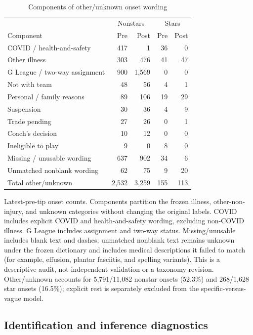 \documentclass[11pt]{article}
\begin{document}
\begin{table}[!htbp]\centering\caption{Components of other/unknown onset wording}\label{tab:otherwording}\small
\begin{tabular}{@{}lrrrr@{}}\toprule
 & \multicolumn{2}{c}{Nonstars} & \multicolumn{2}{c}{Stars}\\
Component & Pre & Post & Pre & Post\\\midrule
COVID / health-and-safety & 417 & 1 & 36 & 0\\
Other illness & 303 & 476 & 41 & 47\\
G League / two-way assignment & 900 & 1,569 & 0 & 0\\
Not with team & 48 & 56 & 4 & 1\\
Personal / family reasons & 89 & 106 & 19 & 29\\
Suspension & 30 & 36 & 4 & 9\\
Trade pending & 27 & 26 & 0 & 1\\
Coach's decision & 10 & 12 & 0 & 0\\
Ineligible to play & 9 & 0 & 8 & 0\\
Missing / unusable wording & 637 & 902 & 34 & 6\\
Unmatched nonblank wording & 62 & 75 & 9 & 20\\
\midrule Total other/unknown & 2,532 & 3,259 & 155 & 113\\\bottomrule\end{tabular}\par\smallskip\raggedright\footnotesize Latest-pre-tip onset counts. Components partition the frozen illness, other-non-injury, and unknown categories without changing the original labels. COVID includes explicit COVID and health-and-safety wording, excluding non-COVID illness. G League includes assignment and two-way status. Missing/unusable includes blank text and dashes; unmatched nonblank text remains unknown under the frozen dictionary and includes medical descriptions it failed to match (for example, effusion, plantar fasciitis, and spelling variants). This is a descriptive audit, not independent validation or a taxonomy revision. Other/unknown accounts for 5,791/11,082 nonstar onsets (52.3\%) and 268/1,628 star onsets (16.5\%); explicit rest is separately excluded from the specific-versus-vague model.
\end{table}

\FloatBarrier
\subsection{Identification and inference diagnostics}\label{app:idaudit}
\end{document}
